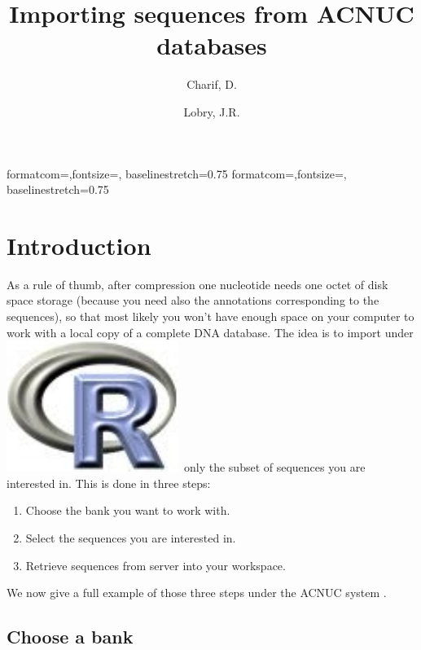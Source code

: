 \documentclass{article}
\title{Importing sequences from ACNUC databases}
\author{Charif, D. \and Lobry, J.R.}
\begin{document}
%
%
{formatcom={\color{Sinput}},fontsize=\footnotesize, baselinestretch=0.75}
{formatcom={\color{Soutput}},fontsize=\footnotesize, baselinestretch=0.75}
%
%
\newcommand{\Rlogo}{\protect\includegraphics[height=1.8ex,keepaspectratio]{../figs/Rlogo.pdf}}
%
%
\newcommand{\seqinr}{\texttt{seqin\bf{R}}}
\newcommand{\Seqinr}{\texttt{Seqin\bf{R}}}
%
%
%
%
%


\maketitle
\tableofcontents

\section{Introduction}

As a rule of thumb, after compression one nucleotide needs one octet
of disk space storage (because you need also the annotations corresponding
to the sequences), so that most likely you won't have enough space on
your computer to work with a local copy of a complete DNA database.
The idea is to import under \Rlogo{}~only the subset of sequences you are
interested in. This is done in three steps:
\begin{enumerate}
\item Choose the bank you want to work with.
\item Select the sequences you are interested in.
\item Retrieve sequences from server into your workspace.
\end{enumerate}
We now give a full example of those three steps under the ACNUC system
\cite{GautierC1982a, GautierC1982b, acnuc1984, acnuc1985, acnuc1985b}.

\subsection{Choose a bank}
\end{document}
